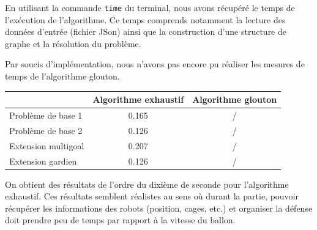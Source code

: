 \documentclass[12pt]{article}
\begin{document}
En utilisant la commande \texttt{time} du terminal, nous avons récupéré le temps de l'exécution de l'algorithme. Ce temps comprends notamment la lecture des données d'entrée (fichier JSon) ainsi que la construction d'une structure de graphe et la résolution du problème.

Par soucis d'implémentation, nous n'avons pas encore pu réaliser les mesures de temps de l'algorithme glouton.

\begin{center}
  \begin{tabular}{|l|c|c|}
    \hline
    & Algorithme exhaustif & Algorithme glouton \\
    \hline
    Problème de base 1 & 0.165 & / \\
    \hline
    Problème de base 2 & 0.126 & / \\
    \hline
    Extension multigoal & 0.207 & / \\
    \hline
    Extension gardien & 0.126 & / \\
    \hline
  \end{tabular}
\end{center}

On obtient des résultats de l'ordre du dixième de seconde pour l'algorithme exhaustif. Ces résultats semblent réalistes au sens où durant la partie, pouvoir récupérer les informations des robots (position, cages, etc.) et organiser la défense doit prendre peu de temps par rapport à la vitesse du ballon.

\end{document}
